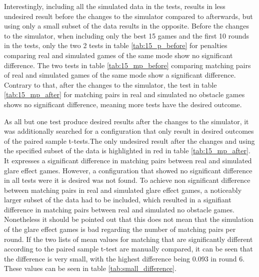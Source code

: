 
Interestingly, including all the simulated data in the tests, results in less undesired result before the changes to the simulator compared to afterwards, but using only a small subset of the data results in the opposite. 
Before the changes to the simulator, when including only the best 15 games and the first 10 rounds in the tests, only the two 2 tests in table \ref{tab:15_p_before} for penalties comparing real and simulated games of the same mode show no significant difference. The two tests in table \ref{tab:15_mp_before} comparing matching pairs of real and simulated games of the same mode show a significant difference. Contrary to that, after the changes to the simulator, the test in table \ref{tab:15_mp_after} for matching pairs in real and simulated no obstacle games shows no significant difference, meaning more tests have the desired outcome. 

As all but one test produce desired results after the changes to the simulator, it was additionally searched for a configuration that only result in desired outcomes of the paired sample t-tests.The only undesired result after the changes and using the specified subset of the data is highlighted in red in table \ref{tab:15_mp_after}. It expresses a significant difference in matching pairs between real and simulated glare effect games. However, a configuration that showed no significant difference in all tests were it is desired was not found. To achieve non significant difference between matching pairs in real and simulated glare effect games, a noticeably larger subset of the data had to be included, which resulted in a signifiant difference in matching pairs between real and simulated no obstacle games. 
Nonetheless it should be pointed out that this does not mean that the simulation of the glare effect games is bad regarding the number of matching pairs per round. If the two lists of mean values for matching that are significantly different according to the paired sample t-test are manually compared, it can be seen that the difference is very small, with the highest difference being 0.093 in round 6. These values can be seen in table \ref{tab:small_difference}.

